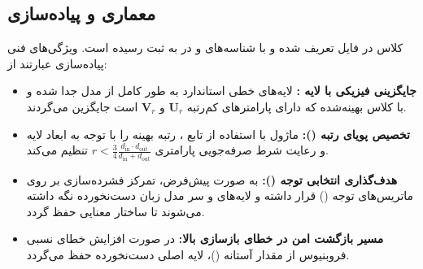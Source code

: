 \subsection{معماری و پیاده‌سازی}
کلاس  در فایل  تعریف شده و با شناسه‌های  و  در  به ثبت رسیده است. ویژگی‌های فنی پیاده‌سازی عبارتند از:
\begin{itemize}
    \item \textbf{جایگزینی فیزیکی با لایه :} لایه‌های خطی استاندارد به طور کامل از مدل جدا شده و با کلاس بهینه‌شده  که دارای پارامترهای کم‌رتبه $\mathbf{U}_r$ و $\mathbf{V}_r$ است جایگزین می‌گردند.
    \item \textbf{تخصیص پویای رتبه ():} ماژول با استفاده از تابع ، رتبه بهینه را با توجه به ابعاد لایه و رعایت شرط صرفه‌جویی پارامتری $r < \frac{3}{4} \frac{d_{\text{in}} \cdot d_{\text{out}}}{d_{\text{in}} + d_{\text{out}}}$ تنظیم می‌کند.
    \item \textbf{هدف‌گذاری انتخابی توجه ():} به صورت پیش‌فرض، تمرکز فشرده‌سازی بر روی ماتریس‌های توجه () قرار داشته و لایه‌های  و سر مدل زبان دست‌نخورده نگه داشته می‌شوند تا ساختار معنایی حفظ گردد.
    \item \textbf{مسیر بازگشت امن در خطای بازسازی بالا:} در صورت افزایش خطای نسبی فروبنیوس از مقدار آستانه ()، لایه اصلی دست‌نخورده حفظ می‌گردد.
\end{itemize}
